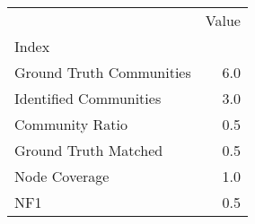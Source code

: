 \begin{tabular}{lr}
\toprule
{} &  Value \\
Index                    &        \\
\midrule
Ground Truth Communities &    6.0 \\
Identified Communities   &    3.0 \\
Community Ratio          &    0.5 \\
Ground Truth Matched     &    0.5 \\
Node Coverage            &    1.0 \\
NF1                      &    0.5 \\
\bottomrule
\end{tabular}
